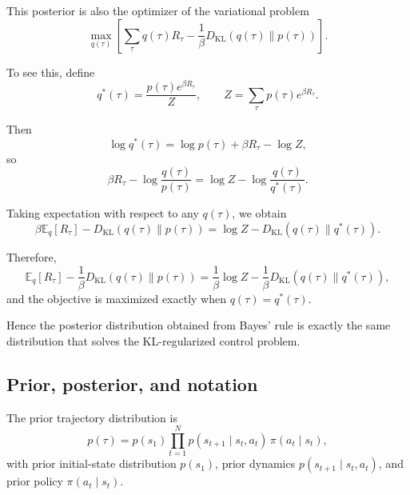 \documentclass[11pt]{article}
\begin{document}
This posterior is also the optimizer of the variational problem
\begin{equation}
    \max_{q(\tau)}
    \left[
        \sum_{\tau} q(\tau)R_\tau
        - \frac{1}{\beta} D_{\mathrm{KL}}(q(\tau)\|p(\tau))
    \right].
\end{equation}

To see this, define
\begin{equation}
    q^*(\tau)=\frac{p(\tau)e^{\beta R_\tau}}{Z},
    \qquad
    Z=\sum_{\tau} p(\tau)e^{\beta R_\tau}.
\end{equation}

Then
\begin{equation}
    \log q^*(\tau)=\log p(\tau)+\beta R_\tau-\log Z,
\end{equation}
so
\begin{equation}
    \beta R_\tau-\log\frac{q(\tau)}{p(\tau)}
    = \log Z - \log\frac{q(\tau)}{q^*(\tau)}.
\end{equation}

Taking expectation with respect to any \(q(\tau)\), we obtain
\begin{equation}
    \beta \mathbb{E}_{q}[R_\tau] - D_{\mathrm{KL}}(q(\tau)\|p(\tau))
    = \log Z - D_{\mathrm{KL}}(q(\tau)\|q^*(\tau)).
\end{equation}

Therefore,
\begin{equation}
    \mathbb{E}_{q}[R_\tau]
    - \frac{1}{\beta}D_{\mathrm{KL}}(q(\tau)\|p(\tau))
    =
    \frac{1}{\beta}\log Z
    - \frac{1}{\beta}D_{\mathrm{KL}}(q(\tau)\|q^*(\tau)),
\end{equation}
and the objective is maximized exactly when \(q(\tau)=q^*(\tau)\).

Hence the posterior distribution obtained from Bayes' rule is exactly the same distribution
that solves the KL-regularized control problem.

\subsection*{Prior, posterior, and notation}

The prior trajectory distribution is
\begin{equation}
    p(\tau) = p(s_1)\prod_{t=1}^{N} p(s_{t+1}\mid s_t,a_t)\,\pi(a_t\mid s_t),
\end{equation}
with prior initial-state distribution \(p(s_1)\), prior dynamics \(p(s_{t+1}\mid s_t,a_t)\),
and prior policy \(\pi(a_t\mid s_t)\).
\end{document}
